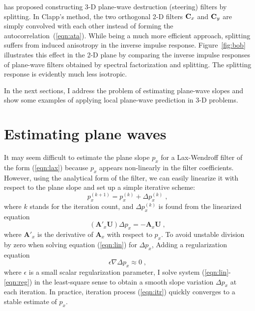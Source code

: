 
\cite{Clapp.sep.105.bob2} has proposed constructing 3-D plane-wave
destruction (steering) filters by splitting. In Clapp's method, the
two orthogonal 2-D filters $\bold{C}_x$ and $\bold{C}_y$ are simply
convolved with each other instead of forming the
autocorrelation~(\ref{eqn:ata}). While being a much more efficient
approach, splitting suffers from induced anisotropy in the inverse
impulse response. Figure~\ref{fig:bob} illustrates this effect in the
2-D plane by comparing the inverse impulse responses of plane-wave
filters obtained by spectral factorization and splitting.  The
splitting response is evidently much less isotropic.


\par
In the next sections, I address the problem of estimating plane-wave
slopes and show some examples of applying local plane-wave prediction
in 3-D problems.

\section{Estimating plane waves}

It may seem difficult to estimate the plane slope $p_x$ for a
Lax-Wendroff filter of the form (\ref{eqn:lax}) because $p_x$ appears
non-linearly in the filter coefficients. However, using the analytical
form of the filter, we can easily linearize it with respect to the
plane slope and set up a simple iterative scheme: 
\begin{equation}
  \label{eqn:itr}
  p_x^{(k+1)} = p_x^{(k)} + \Delta  p_x^{(k)}\;,
\end{equation}
where $k$ stands for the iteration count, and  $\Delta  p_x^{(k)}$ is found
from the linearized equation
\begin{equation}
  \label{eqn:lin}
\left(\mathbf{A'}_x \mathbf{U}\right) \Delta  p_x = - 
\mathbf{A}_x \mathbf{U}\;,
\end{equation}
where $\mathbf{A'}_x$ is the derivative of $\mathbf{A}_x$ with respect to
$p_x$. To avoid unstable division by zero when solving equation
(\ref{eqn:lin}) for $\Delta p_x$, Adding a regularization equation
\begin{equation}
  \label{eqn:reg}
\epsilon \nabla \Delta  p_x \approx 0\;,
\end{equation}
where $\epsilon$ is a small scalar regularization parameter, I solve
system (\ref{eqn:lin}-\ref{eqn:reg}) in the least-square sense to
obtain a smooth slope variation $\Delta p_x$ at each iteration.  In
practice, iteration process (\ref{eqn:itr}) quickly converges to a
stable estimate of $p_x$.
